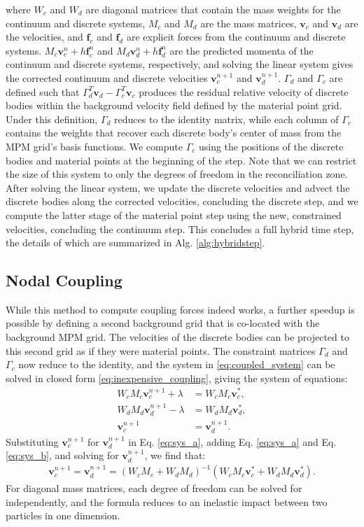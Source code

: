 where $W_c$ and $W_d$ are diagonal matrices that contain the mass weights for the continuum and discrete systems, $M_c$
and $M_d$ are the mass matrices, $\bm{v}_c$ and $\bm{v}_d$ are the velocities, and $\bm{f}_c$ and $\bm{f}_d$ are explicit forces
from the continuum and discrete systems. 
$M_c \bm{v}^n_c + h \bm{f}^n_c$ and $M_d \bm{v}^n_d + h \bm{f}^n_d$ are the predicted momenta of the continuum and discrete systems, respectively, and solving the linear system gives the corrected continuum and discrete velocities $\bm{v}_c^{n+1}$ and $\bm{v}_d^{n+1}$.
$\Gamma_d$ and $\Gamma_c$ are defined such that
$\Gamma_d^T \bm{v}_d - \Gamma_c^T \bm{v}_c$ produces the residual relative velocity of discrete bodies within the background
velocity field defined by the material point grid. Under this definition, $\Gamma_d$ reduces to the identity matrix,
while each column of $\Gamma_c$ contains the weights that recover each discrete body's center of mass from the MPM
grid's basis functions. We compute $\Gamma_c$ using the positions of the discrete bodies and material points at the beginning of the step. Note that we can restrict the size of this system to only the degrees of freedom in the
reconciliation zone. 
After solving the linear system, 
we update the discrete velocities and advect the discrete bodies along the corrected velocities,
concluding the discrete step,
and we compute the latter stage
of the material point step using the new, constrained velocities, concluding the
continuum step. This concludes a full hybrid time step, the details of which are summarized in Alg. \ref{alg:hybridstep}.

\subsection{Nodal Coupling}
While this method to compute coupling forces indeed works, a further speedup is possible by defining a second background
grid that is co-located with the background MPM grid. The velocities of the discrete bodies can be projected to this
second grid as if they were material points. The constraint matrices $\Gamma_d$ and $\Gamma_c$ now reduce to the
identity, and the system in \eqref{eq:coupled_system} can be solved in closed form \eqref{eq:inexpensive_coupling}, giving the system of equations:
\begin{align}
W_c M_c \bm{v}_c^{n+1} + \lambda &= W_c M_c \bm{v}^*_c , \label{eq:sys_a} \\
W_d M_d \bm{v}_d^{n+1} - \lambda &= W_d M_d \bm{v}^*_d , \label{eq:sys_b} \\
\bm{v}_c^{n+1} &= \bm{v}_d^{n+1} . \label{eq:sys_c}
\end{align}
Substituting $\bm{v}_c^{n+1}$ for $\bm{v}_d^{n+1}$ in Eq. \eqref{eq:sys_a}, adding Eq. \eqref{eq:sys_a} and Eq. \eqref{eq:sys_b},
and solving for $\bm{v}_d^{n+1}$, we find that:
\begin{align}
\label{eq:inexpensive_coupling}
\bm{v}_c^{n+1} = \bm{v}_d^{n+1} = \left( W_c M_c + W_d M_d \right)^{-1} \left( W_c M_c \bm{v}_c^* + W_d M_d \bm{v}_d^* \right) .
\end{align}
For diagonal mass matrices, each degree of freedom can be solved for independently, and the formula reduces to an
inelastic impact between two particles in one dimension.

